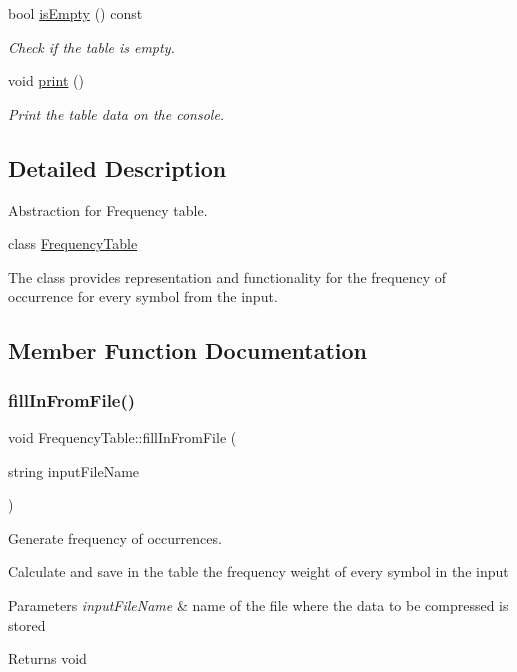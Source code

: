\begin{DoxyCompactItemize}
bool \mbox{\hyperlink{class_frequency_table_ab7a061dda60815f087bd2ccf41a2917f}{is\+Empty}} () const
\begin{DoxyCompactList}\small\item\em Check if the table is empty. \end{DoxyCompactList}\item 
\mbox{\label{class_frequency_table_a35974984c9ef4e7ef69c14a247179164}} 
void \mbox{\hyperlink{class_frequency_table_a35974984c9ef4e7ef69c14a247179164}{print}} ()
\begin{DoxyCompactList}\small\item\em Print the table data on the console. \end{DoxyCompactList}\end{DoxyCompactItemize}


\subsection{Detailed Description}
Abstraction for Frequency table. 

class \mbox{\hyperlink{class_frequency_table}{Frequency\+Table}}

The class provides representation and functionality for the frequency of occurrence for every symbol from the input. 

\subsection{Member Function Documentation}
\mbox{\label{class_frequency_table_ad556d8ff9846ff76eb3cce00d69ea67a}} 
\subsubsection{\texorpdfstring{fillInFromFile()}{fillInFromFile()}}
{\footnotesize\ttfamily void Frequency\+Table\+::fill\+In\+From\+File (\begin{DoxyParamCaption}\item[{string}]{input\+File\+Name }\end{DoxyParamCaption})}



Generate frequency of occurrences. 

Calculate and save in the table the frequency weight of every symbol in the input 
\begin{DoxyParams}{Parameters}
{\em input\+File\+Name} & name of the file where the data to be compressed is stored \\
\hline
\end{DoxyParams}
\begin{DoxyReturn}{Returns}
void 
\end{DoxyReturn}
\mbox{\label{class_frequency_table_a02fd0379aafe9f2028637b86ed8301e8}} 
